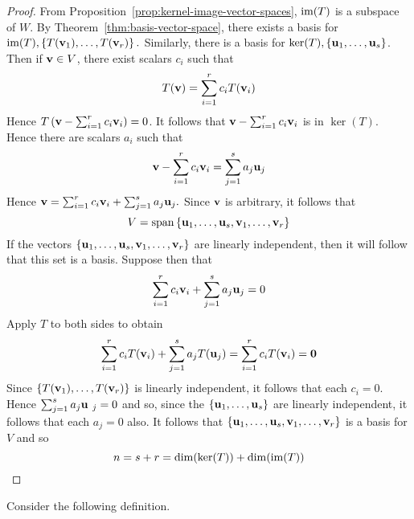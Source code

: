 \begin{proof}
From Proposition~\ref{prop:kernel-image-vector-spaces}, $\mbox{\rm im}(T) $
is a subspace of $W$. By Theorem~\ref{thm:basis-vector-space}, there exists a basis for $
\mbox{\rm im}(T) ,\left\{T(\mbox{\bf v}_{1}),\ldots,T(\mbox{\bf v}_{r})\right\}
. $ Similarly, there is a basis for $\ker (T) ,\left\{\mbox{\bf u}
_{1},\ldots,\mbox{\bf u}_{s}\right\}$. Then if $\mbox{\bf v}\in V$, there exist
scalars $c_{i}$ such that
\begin{equation*}
T(\mbox{\bf v})=\sum_{i=1}^{r}c_{i}T(\mbox{\bf v}_{i})
\end{equation*}
Hence $T\left(\mbox{\bf v}-\sum_{i=1}^{r}c_{i}\mbox{\bf v}_{i}\right) =0$. It follows
that $\mbox{\bf v}-\sum_{i=1}^{r}c_{i}\mbox{\bf v}_{i}$ is in $\ker (T)$.
Hence there are scalars $a_{i}$ such that
\begin{equation*}
\mbox{\bf v}-\sum_{i=1}^{r}c_{i}\mbox{\bf v}_{i}=\sum_{j=1}^{s}a_{j}\mbox{\bf u}_{j}
\end{equation*}
Hence $\mbox{\bf v}=\sum_{i=1}^{r}c_{i}\mbox{\bf v}_{i}+\sum_{j=1}^{s}a_{j}\mbox{\bf u}
_{j}. $ Since $\mbox{\bf v}$ is arbitrary, it follows that
\begin{equation*}
V=\sspan\set{\vect{u}_{1},\ldots,\vect{u}_{s},\vect{v}_{1},\ldots,
\vect{v}_{r}}
\end{equation*}
If the vectors $\left\{\mbox{\bf u}_{1},\ldots,\mbox{\bf u}_{s},\mbox{\bf v}_{1},\ldots,
\mbox{\bf v}_{r}\right\} $ are linearly independent, then it will follow that
this set is a basis. Suppose then that
\begin{equation*}
\sum_{i=1}^{r}c_{i}\mbox{\bf v}_{i}+\sum_{j=1}^{s}a_{j}\mbox{\bf u}_{j}=0
\end{equation*}
Apply $T$ to both sides to obtain
\begin{equation*}
\sum_{i=1}^{r}c_{i}T(\mbox{\bf v}_{i})+\sum_{j=1}^{s}a_{j}T(\mbox{\bf u}
_{j})=\sum_{i=1}^{r}c_{i}T(\mbox{\bf v}_{i})= \mbox{\bf 0}
\end{equation*}
Since $\left\{T(\mbox{\bf v}_{1}),\ldots,T(\mbox{\bf v}_{r})\right\} $ is linearly
independent, it follows that each $c_{i}=0$. Hence $\sum_{j=1}^{s}a_{j}\mbox{\bf u
}_{j}=0$ and so, since the $\left\{\mbox{\bf u}_{1},\ldots,\mbox{\bf u}_{s}\right\} $
are linearly independent, it follows that each $a_{j}=0$ also. It follows
that $\left\{\mbox{\bf u}_{1},\ldots,\mbox{\bf u}_{s},\mbox{\bf v}_{1},\ldots,\mbox{\bf v}
_{r}\right\} $ is a basis for $V$ and so
\begin{equation*}
n=s+r=\dim (\ker (T)) +\dim (\mbox{\rm im}(
T))
\end{equation*}
\end{proof}

Consider the following definition.


